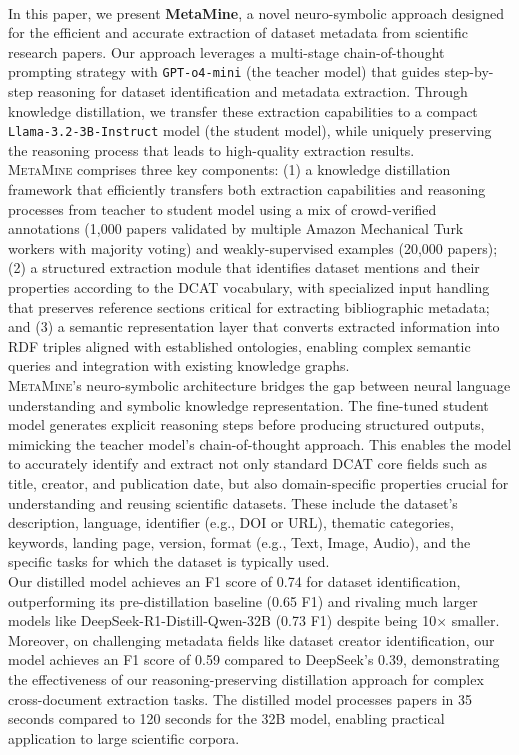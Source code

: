 \documentclass[runningheads]{llncs}
\begin{document}
\\
\noindent
In this paper, we present \textbf{MetaMine}, a novel neuro-symbolic approach designed for the efficient and accurate extraction of dataset metadata from scientific research papers. Our approach leverages a multi-stage chain-of-thought prompting strategy with \texttt{GPT-o4-mini} (the teacher model) that guides step-by-step reasoning for dataset identification and metadata extraction. Through knowledge distillation, we transfer these extraction capabilities to a compact \texttt{Llama-3.2-3B-Instruct} model (the student model), while uniquely preserving the reasoning process that leads to high-quality extraction results.
\\
\noindent
\textsc{MetaMine} comprises three key components: (1) a knowledge distillation framework that efficiently transfers both extraction capabilities and reasoning processes from teacher to student model using a mix of crowd-verified annotations (1,000 papers validated by multiple Amazon Mechanical Turk workers with majority voting) and weakly-supervised examples (20,000 papers); (2) a structured extraction module that identifies dataset mentions and their properties according to the DCAT vocabulary, with specialized input handling that preserves reference sections critical for extracting bibliographic metadata; and (3) a semantic representation layer that converts extracted information into RDF triples aligned with established ontologies, enabling complex semantic queries and integration with existing knowledge graphs.
\\
\noindent
\textsc{MetaMine}'s neuro-symbolic architecture bridges the gap between neural language understanding and symbolic knowledge representation. The fine-tuned student model generates explicit reasoning steps before producing structured outputs, mimicking the teacher model's chain-of-thought approach. This enables the model to accurately identify and extract not only standard DCAT core fields such as title, creator, and publication date, but also domain-specific properties crucial for understanding and reusing scientific datasets. These include the dataset's description, language, identifier (e.g., DOI or URL), thematic categories, keywords, landing page, version, format (e.g., Text, Image, Audio), and the specific tasks for which the dataset is typically used.
\\
\noindent
Our distilled model achieves an F1 score of 0.74 for dataset identification, outperforming its pre-distillation baseline (0.65 F1) and rivaling much larger models like DeepSeek-R1-Distill-Qwen-32B (0.73 F1) despite being 10× smaller. Moreover, on challenging metadata fields like dataset creator identification, our model achieves an F1 score of 0.59 compared to DeepSeek's 0.39, demonstrating the effectiveness of our reasoning-preserving distillation approach for complex cross-document extraction tasks. The distilled model processes papers in 35 seconds compared to 120 seconds for the 32B model, enabling practical application to large scientific corpora.
\\
\noindent
\end{document}
